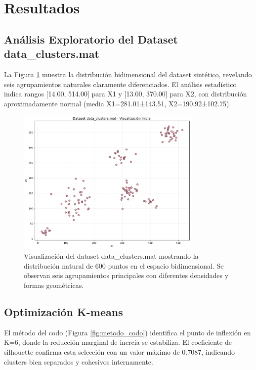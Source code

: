 \documentclass[12pt,a4paper]{article}
\begin{document}
\section{Resultados}

\subsection{Análisis Exploratorio del Dataset data\_clusters.mat}

La Figura \ref{fig:dataset_original} muestra la distribución bidimensional del dataset sintético, revelando seis agrupamientos naturales claramente diferenciados. El análisis estadístico indica rangos [14.00, 514.00] para X1 y [13.00, 370.00] para X2, con distribución aproximadamente normal (media X1=281.01±143.51, X2=190.92±102.75).

\begin{figure}[H]
    \centering
    \includegraphics[width=0.8\textwidth]{figures/figura_01_dataset_original.pdf}
    \caption{Visualización del dataset data\_clusters.mat mostrando la distribución natural de 600 puntos en el espacio bidimensional. Se observan seis agrupamientos principales con diferentes densidades y formas geométricas.}
    \label{fig:dataset_original}
\end{figure}

\subsection{Optimización K-means}

El método del codo (Figura \ref{fig:metodo_codo}) identifica el punto de inflexión en K=6, donde la reducción marginal de inercia se estabiliza. El coeficiente de silhouette confirma esta selección con un valor máximo de 0.7087, indicando clusters bien separados y cohesivos internamente.
\end{document}
